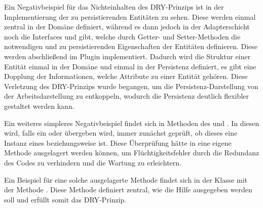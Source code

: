 Ein Negativbeispiel für das Nichteinhalten des DRY-Prinzips ist in der Implementierung der zu persistierenden Entitäten zu sehen. Diese werden einmal zentral in der Domäne definiert, während es dann jedoch in der Adapterschicht noch die Interfaces  und  gibt, welche durch Getter- und Setter-Methoden die notwendigen und zu persistierenden Eigenschaften der Entitäten definieren. Diese werden abschließend im  Plugin implementiert. Dadurch wird die Struktur einer Entität einmal in der Domäne und einmal in der Persistenz definiert, es gibt eine Dopplung der Informationen, welche Attribute zu einer Entität gehören. Diese Verletzung des DRY-Prinzips wurde begangen, um die Persistenz-Darstellung von der Arbeitsdarstellung zu entkoppeln, wodurch die Persistenz deutlich flexibler gestaltet werden kann.

Ein weiteres simpleres Negativbeispiel findet sich in Methoden des  und . In diesen wird, falls ein  oder  übergeben wird, immer zunächst geprüft, ob dieses eine Instanz eines  beziehungsweise  ist. Diese Überprüfung hätte in eine eigene Methode ausgelagert werden können, um Flüchtigkeitsfehler durch die Redundanz des Codes zu verhindern und die Wartung zu erleichtern.

Ein Beispiel für eine solche ausgelagerte Methode findet sich in der Klasse  mit der Methode . Diese Methode definiert zentral, wie die Hilfe ausgegeben werden soll und erfüllt somit das DRY-Prinzip.